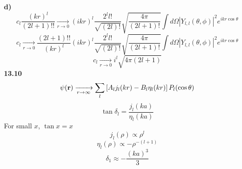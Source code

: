 \documentclass[english]{article}
\begin{document}
\textbf{d)}
$$c_l\frac{(kr)^l}{(2l+1)!!}\xrightarrow[r\rightarrow0]{}(ikr)^l\frac{2^ll!}{\sqrt{(2l)!}}\sqrt{\frac{4\pi}{(2l+1)!}}\int d\Omega\left|Y_{l,l}(\theta,\phi)\right|^2e^{ikr\cos\theta}$$
$$c_l\xrightarrow[r\rightarrow0]{}\frac{(2l+1)!!}{(kr)^l}(ikr)^l\frac{2^ll!}{\sqrt{(2l)!}}\sqrt{\frac{4\pi}{(2l+1)!}}\int d\Omega\left|Y_{l,l}(\theta,\phi)\right|^2e^{ikr\cos\theta}$$
$$c_l\xrightarrow[r\rightarrow0]{}i^l\sqrt{4\pi(2l+1)}$$
\textbf{13.10}
$$\psi(\vb{r})\xrightarrow[r\rightarrow\infty]{}\sum_l\left[A_lj_l(kr)-B_l\eta_l(kr)\right]P_l(\cos\theta)$$
$$\tan\delta_l=\frac{j_l(ka)}{\eta_l(ka)}$$
For small $x$, $\tan x=x$
$$j_l(\rho)\propto\rho^l$$
$$\eta_l(\rho)\propto-\rho^{-(l+1)} $$
$$\delta_1\approx-\frac{(ka)^3}{3}$$
\end{document}
